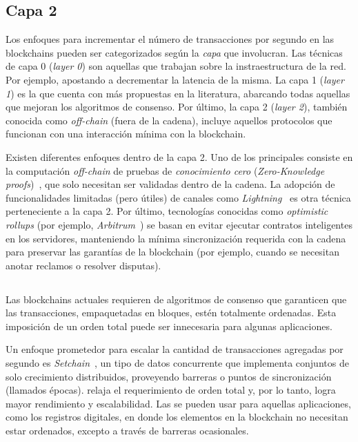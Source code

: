 
\subsection{Capa 2}
Los enfoques para incrementar el número de transacciones por segundo en las blockchains pueden
ser categorizados según la \emph{capa} que involucran.
%
Las técnicas de capa 0 (\textit{layer 0}) son aquellas que trabajan sobre la instraestructura de la red.
%
Por ejemplo, apostando a decrementar la latencia de la misma.
% 
La capa 1 (\textit{layer 1}) es la que cuenta con más propuestas en la literatura, abarcando todas aquellas que
mejoran los algoritmos de consenso.
%
Por último, la capa 2 (\textit{layer 2}), también conocida como \emph{off-chain} (fuera de la cadena),
incluye aquellos protocolos que funcionan con una interacción mínima con la
blockchain\cite{Jourenko2019SoKAT}.

Existen diferentes enfoques dentro de la capa 2.
%
Uno de los principales consiste en la computación \emph{off-chain} de pruebas de \emph{conocimiento cero}
(\emph{Zero-Knowledge proofs})~\cite{Sasson2014ZKvonNeumann}, que solo necesitan ser validadas dentro de la cadena.
%
La adopción de funcionalidades limitadas (pero útiles) de canales como \emph{Lightning}~\cite{Poon2016lightning}
es otra técnica perteneciente a la capa 2.
%
Por último, tecnologías conocidas como \emph{optimistic rollups} (por ejemplo, \emph{Arbitrum}~\cite{Kalodner2018Arbitrum})
se basan en evitar ejecutar contratos inteligentes
en los servidores, manteniendo la mínima sincronización requerida con la cadena para preservar las garantías
de la blockchain (por ejemplo, cuando se necesitan anotar reclamos o resolver disputas).

\subsection{\setchain}
Las blockchains actuales requieren de algoritmos de consenso que garanticen que las
transacciones, empaquetadas en bloques, estén totalmente ordenadas.
%
Esta imposición de un orden total puede ser innecesaria para algunas aplicaciones.

%
Un enfoque prometedor para escalar la cantidad de transacciones agregadas por segundo
es \textit{Setchain}~\cite{Capretto.2022.Setchain},
un tipo de datos concurrente que implementa conjuntos de solo crecimiento distribuidos,
proveyendo barreras o puntos de sincronización (llamados épocas).
%
\setchain relaja el requerimiento de orden total y, por lo tanto, logra mayor
rendimiento y escalabilidad.
%
Las \setchains se pueden usar para aquellas aplicaciones, como los registros digitales,
en donde los elementos en la blockchain no necesitan estar ordenados, excepto a través
de barreras ocasionales.

